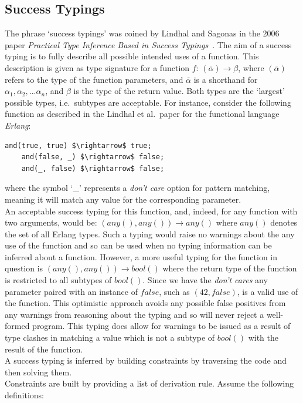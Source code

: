 \documentclass[12pt, titlepage]{article}
\begin{document}
\subsection{Success Typings}
The phrase `success typings' was coined by Lindhal and Sagonas in the 2006 paper \textit{Practical Type Inference Based in Success Typings}~\cite{lindhal06}. The aim of a success typing is to fully describe all possible intended uses of a function. This description is given as type signature for a function $f$: $(\bar{\alpha}) \rightarrow \beta$, where $(\bar{\alpha})$ refers to the type of the function parameters, and $\bar{\alpha}$ is a shorthand for $\alpha_1, \alpha_2,...\alpha_n$, and $\beta$ is the type of the return value. Both types are the `largest' possible types, i.e.\ subtypes are acceptable. For instance, consider the following function as described in the Lindhal et al.\ paper for the functional language \textit{Erlang}:
\begin{lstlisting}[mathescape]
	and(true, true) $\rightarrow$ true;
	and(false, _) $\rightarrow$ false;
	and(_, false) $\rightarrow$ false;
\end{lstlisting}
where the symbol `\_' represents a \textit{don't care} option for pattern matching, meaning it will match any value for the corresponding parameter. \\
An acceptable success typing for this function, and, indeed, for any function with two arguments, would be: $(any(), any()) \rightarrow any()$ where $any()$ denotes the set of all Erlang types. Such a typing would raise no warnings about the any use of the function and so can be used when no typing information can be inferred about a function. However, a more useful typing for the function in question is $(any(), any()) \rightarrow bool()$ where the return type of the function is restricted to all subtypes of $bool()$. Since we have the \textit{don't cares} any parameter paired with an instance of $false$, such as $(42, false)$, is a valid use of the function. This optimistic approach avoids any possible false positives from any warnings from reasoning about the typing and so will never reject a well-formed program. This typing does allow for warnings to be issued as a result of type clashes in matching a value which is not a subtype of $bool()$ with the result of the function. \\
A success typing is inferred by building constraints by traversing the code and then solving them. \\
Constraints are built by providing a list of derivation rule. Assume the following definitions:
\end{document}
